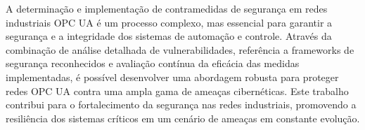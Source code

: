     A determinação e implementação de contramedidas de segurança em redes industriais OPC UA é um processo complexo, mas essencial para garantir a segurança e a integridade dos sistemas de automação e controle. Através da combinação de análise detalhada de vulnerabilidades, referência a frameworks de segurança reconhecidos e avaliação contínua da eficácia das medidas implementadas, é possível desenvolver uma abordagem robusta para proteger redes OPC UA contra uma ampla gama de ameaças cibernéticas. Este trabalho contribui para o fortalecimento da segurança nas redes industriais, promovendo a resiliência dos sistemas críticos em um cenário de ameaças em constante evolução.







    



